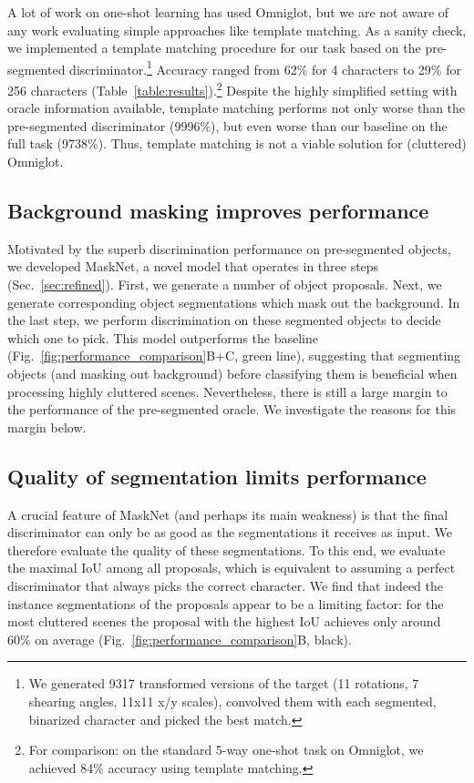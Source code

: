 \documentclass{article}
\begin{document}
A lot of work on one-shot learning has used Omniglot, but we are not aware of any work evaluating simple approaches like template matching. As a sanity check, we implemented a template matching procedure for our task based on the pre-segmented discriminator.\footnote{We generated 9317 transformed versions of the target (11 rotations, 7 shearing angles, 11x11 x/y scales), convolved them with each segmented, binarized character and picked the best match.} Accuracy ranged from 62\% for 4 characters to 29\% for 256 characters (Table~\ref{table:results}).\footnote{For comparison: on the standard 5-way one-shot task on Omniglot, we achieved 84\% accuracy using template matching.} Despite the highly simplified setting with oracle information available, template matching performs not only worse than the pre-segmented discriminator (9996\%), but even worse than our baseline on the full task (9738\%). Thus, template matching is not a viable solution for (cluttered) Omniglot.



\subsection{Background masking improves performance}
\label{sec:results/full_model}

Motivated by the superb discrimination performance on pre-segmented objects, we developed MaskNet, a novel model that operates in three steps (Sec.~\ref{sec:refined}).
First, we generate a number of object proposals.
Next, we generate corresponding object segmentations which mask out the background.
In the last step, we perform discrimination on these segmented objects to decide which one to pick.
This model outperforms the baseline (Fig.~\ref{fig:performance_comparison}B+C, green line), suggesting that segmenting objects (and masking out background) before classifying them is beneficial when processing highly cluttered scenes.
Nevertheless, there is still a large margin to the performance of the pre-segmented oracle.
We investigate the reasons for this margin below.


\subsection{Quality of segmentation limits performance}
\label{sec:results/upper_bound}

A crucial feature of MaskNet (and perhaps its main weakness) is that the final discriminator can only be as good as the segmentations it receives as input.
We therefore evaluate the quality of these segmentations.
To this end, we evaluate the maximal IoU among all proposals, which is equivalent to assuming a perfect discriminator that always picks the correct character.
We find that indeed  the instance segmentations of the proposals appear to be a limiting factor: for the most cluttered scenes the proposal with the highest IoU achieves only around 60\% on average (Fig.~\ref{fig:performance_comparison}B, black).
\end{document}
